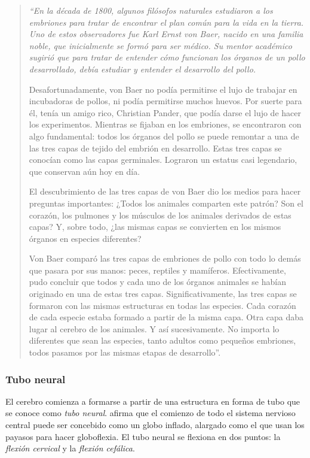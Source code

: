 \begin{quote}
{\it ``En la década de 1800, algunos filósofos naturales estudiaron a los embriones para tratar de encontrar el plan común para la vida en la tierra. Uno de estos observadores fue Karl Ernst von Baer, nacido en una familia noble, que inicialmente se formó para ser médico. Su mentor académico sugirió que para tratar de entender cómo funcionan los órganos de un pollo desarrollado, debía estudiar y entender el desarrollo del pollo.

Desafortunadamente, von Baer no podía permitirse el lujo de trabajar en incubadoras de pollos, ni podía permitirse muchos huevos. Por suerte para él, tenía un amigo rico, Christian Pander, que podía darse el lujo de hacer los experimentos. Mientras se fijaban en los embriones, se encontraron con algo fundamental: todos los órganos del pollo se puede remontar a una de las tres capas de tejido del embrión en desarrollo. Estas tres capas se conocían como las capas germinales. Lograron un estatus casi legendario, que conservan aún hoy en día.

El descubrimiento de las tres capas de von Baer dio los medios para hacer preguntas importantes: ¿Todos los animales comparten este patrón? Son el corazón, los pulmones y los músculos de los animales derivados de estas capas? Y, sobre todo, ¿las mismas capas se convierten en los mismos órganos en especies diferentes?

Von Baer comparó las tres capas de embriones de pollo con todo lo demás que pasara por sus manos: peces, reptiles y mamíferos. Efectivamente, pudo concluir que todos y cada uno de los órganos animales se habían originado en una de estas tres capas. Significativamente, las tres capas se formaron con las mismas estructuras en todas las especies. Cada corazón de cada especie estaba formado a partir de la misma capa. Otra capa daba lugar al cerebro de los animales. Y así sucesivamente. No importa lo diferentes que sean las especies, tanto adultos como pequeños embriones, todos pasamos por las mismas etapas de desarrollo''.}

\end{quote}

\subsubsection{Tubo neural}
\label{tubo}
El cerebro comienza a formarse a partir de una estructura en forma de tubo que se conoce como {\it tubo neural}. \cite{Lautin2001} afirma que el comienzo de todo el sistema nervioso central puede ser concebido como un globo inflado, alargado como el que usan los payasos para hacer globoflexia. El tubo neural se flexiona en dos puntos: la {\it flexión cervical} y la {\it flexión cefálica}.


